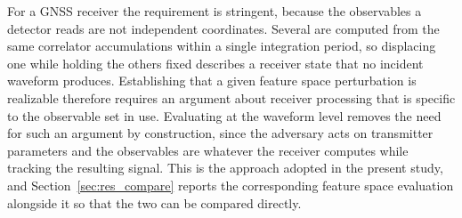 For a GNSS receiver the requirement is stringent, because the observables a detector reads
are not independent coordinates. Several are computed from the same correlator
accumulations within a single integration period, so displacing one while holding the
others fixed describes a receiver state that no incident waveform produces. Establishing
that a given feature space perturbation is realizable therefore requires an argument about
receiver processing that is specific to the observable set in use. Evaluating at the
waveform level removes the need for such an argument by construction, since the adversary
acts on transmitter parameters and the observables are whatever the receiver computes while
tracking the resulting signal. This is the approach adopted in the present study, and
Section~\ref{sec:res_compare} reports the corresponding feature space evaluation alongside
it so that the two can be compared directly.
